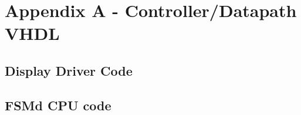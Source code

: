 \section{Appendix A - Controller/Datapath VHDL}
\subsection{Display Driver Code}









\subsection{FSMd CPU code}
